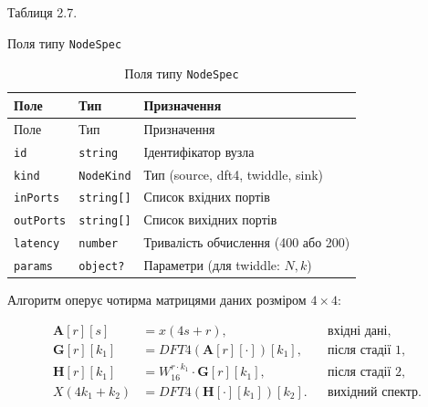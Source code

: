 Таблиця 2.7.

Поля типу \texttt{NodeSpec}

\begin{longtable}[]{@{}
  >{\raggedright\arraybackslash}p{}
  >{\raggedright\arraybackslash}p{}
  >{\raggedright\arraybackslash}p{}@{}}
\caption[Поля типу NodeSpec]{Поля типу \texttt{NodeSpec}}\tabularnewline
\toprule\noalign{}
\begin{minipage}[b]{\linewidth}\raggedright
Поле
\end{minipage} & \begin{minipage}[b]{\linewidth}\raggedright
Тип
\end{minipage} & \begin{minipage}[b]{\linewidth}\raggedright
Призначення
\end{minipage} \\
\midrule\noalign{}
\endfirsthead
\toprule\noalign{}
\begin{minipage}[b]{\linewidth}\raggedright
Поле
\end{minipage} & \begin{minipage}[b]{\linewidth}\raggedright
Тип
\end{minipage} & \begin{minipage}[b]{\linewidth}\raggedright
Призначення
\end{minipage} \\
\midrule\noalign{}
\endhead
\bottomrule\noalign{}
\endlastfoot
\texttt{id} & \texttt{string} & Ідентифікатор вузла \\
\texttt{kind} & \texttt{NodeKind} & Тип (source, dft4, twiddle, sink) \\
\texttt{inPorts} & \texttt{string[]} & Список вхідних портів \\
\texttt{outPorts} & \texttt{string[]} & Список вихідних портів \\
\texttt{latency} & \texttt{number} & Тривалість обчислення (400 або 200) \\
\texttt{params} & \texttt{object?} & Параметри (для twiddle: \(N,k\)) \\
\end{longtable}

Алгоритм оперує чотирма матрицями даних розміром \(4\times4\):

\[\begin{aligned}
\mathbf{A}[r][s] &= x(4s+r), & &\text{вхідні дані,} \\
\mathbf{G}[r][k_{1}] &= DFT4(\mathbf{A}[r][\cdot])[k_{1}], & &\text{після стадії 1,} \\
\mathbf{H}[r][k_{1}] &= W_{16}^{r\cdot k_{1}}\cdot\mathbf{G}[r][k_{1}], & &\text{після стадії 2,} \\
X(4k_{1}+k_{2}) &= DFT4(\mathbf{H}[\cdot][k_{1}])[k_{2}]. & &\text{вихідний спектр.}
\end{aligned}\]

